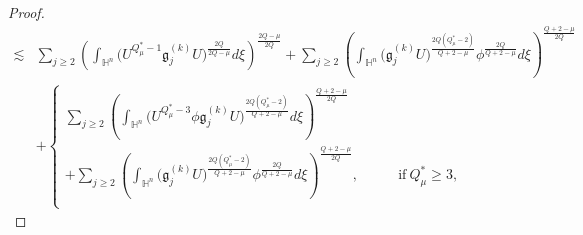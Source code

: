 \documentclass[11pt]{article}
\begin{document}
\begin{proof}
\begin{align}
 \lesssim &
 \sum\limits_{j\geq2} \left(\int_{\mathbb{H}^{n}}\Big(U^{Q^{\ast}_{\mu}-1} \mathfrak{g}_j^{(k)} U  \Big)^{\frac{2Q}{2Q-\mu}} d\xi\right )^{\frac{2Q-\mu}{2Q}}%
 +\sum\limits_{j\geq2} \left(\int_{\mathbb{H}^{n}}\Big( \mathfrak{g}_j^{(k)} U  \Big)^{\frac{2Q(Q_\mu^*-2)}{Q+2-\mu}}\phi^{\frac{2Q}{Q+2-\mu}} d\xi\right )^{\frac{Q+2-\mu}{2Q}}
\nonumber \\
 &+\begin{cases}
\displaystyle\sum\limits_{j\geq2} \left(\int_{\mathbb{H}^{n}}\Big(  U^{Q^{\ast}_{\mu}-3}  \phi \mathfrak{g}_j^{(k)} U   \Big)^{\frac{2Q(Q_\mu^*-2)}{Q+2-\mu}} d\xi\right )^{\frac{Q+2-\mu}{2Q}}\\
\displaystyle+\sum\limits_{j\geq2} \left(\int_{\mathbb{H}^{n}}\Big( \mathfrak{g}_j^{(k)} U  \Big)^{\frac{2Q(Q_\mu^*-2)}{Q+2-\mu}}\phi^{\frac{2Q}{Q+2-\mu}} d\xi\right )^{\frac{Q+2-\mu}{2Q}}, \qquad &\mathrm{if}~Q_\mu^*\geq3,\nonumber\\

\end{cases}
\end{align}
\end{proof}
\end{document}
